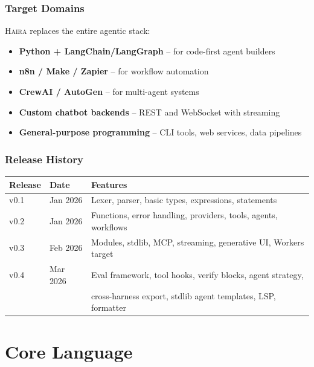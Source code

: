 \documentclass[11pt,a4paper]{book}
\newcommand{\haira}{\textsc{Haira}}
\begin{document}
\section*{Target Domains}

\haira{} replaces the entire agentic stack:
\begin{itemize}
    \item \textbf{Python + LangChain/LangGraph} -- for code-first agent builders
    \item \textbf{n8n / Make / Zapier} -- for workflow automation
    \item \textbf{CrewAI / AutoGen} -- for multi-agent systems
    \item \textbf{Custom chatbot backends} -- REST and WebSocket with streaming
    \item \textbf{General-purpose programming} -- CLI tools, web services, data pipelines
\end{itemize}

\section*{Release History}

\begin{longtable}{lll}
\toprule
\textbf{Release} & \textbf{Date} & \textbf{Features} \\
\midrule
\endhead
v0.1 & Jan 2026 & Lexer, parser, basic types, expressions, statements \\
v0.2 & Jan 2026 & Functions, error handling, providers, tools, agents, workflows \\
v0.3 & Feb 2026 & Modules, stdlib, MCP, streaming, generative UI, Workers target \\
v0.4 & Mar 2026 & Eval framework, tool hooks, verify blocks, agent strategy, \\
 & & cross-harness export, stdlib agent templates, LSP, formatter \\
\bottomrule
\end{longtable}

\part{Core Language}








\end{document}
